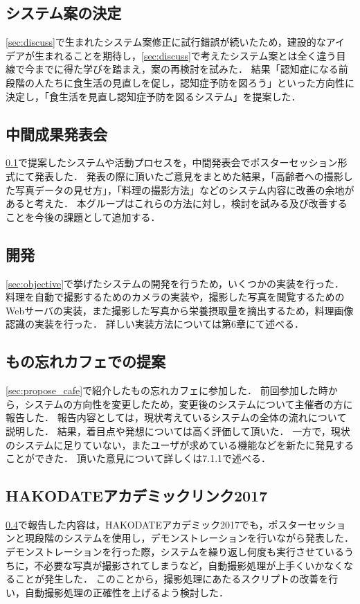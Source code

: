 \documentclass[../report]{subfiles}
\begin{document}
\subsection{システム案の決定} \label{sec:decision}
\ref{sec:discuss}で生まれたシステム案修正に試行錯誤が続いたため，建設的なアイデアが生まれることを期待し，\ref{sec:discuss}で考えたシステム案とは全く違う目線で今までに得た学びを踏まえ，案の再検討を試みた．
結果「認知症になる前段階の人たちに食生活の見直しを促し，認知症予防を図ろう」といった方向性に決定し，「食生活を見直し認知症予防を図るシステム」を提案した．

\subsection{中間成果発表会}
\ref{sec:decision}で提案したシステムや活動プロセスを，中間発表会でポスターセッション形式にて発表した．
発表の際に頂いたご意見をまとめた結果，「高齢者への撮影した写真データの見せ方」，「料理の撮影方法」などのシステム内容に改善の余地があると考えた．
本グループはこれらの方法に対し，検討を試みる及び改善することを今後の課題として追加する．

\subsection{開発}
\ref{sec:objective}で挙げたシステムの開発を行うため，いくつかの実装を行った．
料理を自動で撮影するためのカメラの実装や，撮影した写真を閲覧するためのWebサーバの実装，また撮影した写真から栄養摂取量を摘出するため，料理画像認識の実装を行った．
詳しい実装方法については第6章にて述べる．

\subsection{もの忘れカフェでの提案} \label{sec:propose_cafe2}
\ref{sec:propose_cafe}で紹介したもの忘れカフェに参加した．
前回参加した時から，システムの方向性を変更したため，変更後のシステムについて主催者の方に報告した．
報告内容としては，現状考えているシステムの全体の流れについて説明した．
結果，着目点や発想については高く評価して頂いた．
一方で，現状のシステムに足りていない，またユーザが求めている機能などを新たに発見することができた．
頂いた意見について詳しくは7.1.1で述べる．

\subsection{HAKODATEアカデミックリンク2017}
\ref{sec:propose_cafe2}で報告した内容は，HAKODATEアカデミック2017でも，ポスターセッションと現段階のシステムを使用し，デモンストレーションを行いながら発表した．
デモンストレーションを行った際，システムを繰り返し何度も実行させているうちに，不必要な写真が撮影されてしまうなど，自動撮影処理が上手くいかなくなることが発生した．
このことから，撮影処理にあたるスクリプトの改善を行い，自動撮影処理の正確性を上げるよう検討した．
\end{document}

